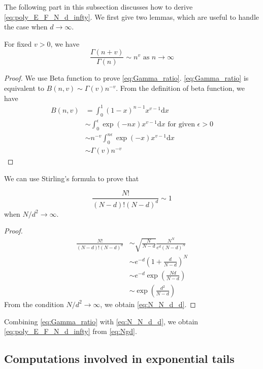 \documentclass{aptpub}
\def\d{\mathrm{d}}
\begin{document}
The following part in this subsection discusses how to derive \eqref{eq:poly_E_F_N_d_infty}.
We first give two lemmas, which are useful to handle the case when $d\to \infty$.
\begin{lemma}\label{lem:Gamma_ratio}
     For fixed $v>0$, we have
     \begin{equation}\label{eq:Gamma_ratio}
         \frac{\Gamma(n+v)}{\Gamma(n)} \sim
         n^v
         \textrm{ as } n \to \infty             
     \end{equation}
 \end{lemma}
 \begin{proof}
     We use Beta function to prove \eqref{eq:Gamma_ratio}.
     \eqref{eq:Gamma_ratio} is equivalent to
     $B(n, v) \sim \Gamma(v) n^{-v}$.
     From the definition of beta function,
     we have
     \begin{align*}
         B(n,v) &=\int_0^1 (1-x)^{n-1} x^{v-1} \d x \\
         &\sim \int_0^{\epsilon} \exp(-nx) x^{v-1}\d x \textrm{ for given } \epsilon>0\\
         & \sim n^{-v} \int_0^{n\epsilon} \exp(-x)x^{v-1}\d x\\
         &\sim \Gamma(v) n^{-v}
     \end{align*}
 \end{proof}
We can use Stirling's formula to prove that
\begin{lemma}
\begin{equation}\label{eq:N_N_d_d}
     \frac{N!}{(N-d)! (N-d)^d} \sim 1
\end{equation}
when $N/d^2 \to \infty$.
\end{lemma}
\begin{proof}
     \begin{align*}
          \frac{N!}{(N-d)! (N-d)^d}
          &\sim \sqrt{\frac{N}{N-d}}\frac{N^N}{ e^d (N-d)^{N}}\\
          &\sim e^{-d} (1+\frac{d}{N-d})^{N} \\
          &\sim e^{-d} \exp(\frac{Nd}{N-d}) \\
          & \sim \exp(\frac{d^2}{N-d})
     \end{align*}
From the condition $N/d^2 \to \infty$,
we obtain \eqref{eq:N_N_d_d}.
\end{proof}
Combining \eqref{eq:Gamma_ratio} with \eqref{eq:N_N_d_d}, we obtain \eqref{eq:poly_E_F_N_d_infty}
from \eqref{eq:Ngd}.

\subsection{Computations involved in exponential tails}
\end{document}
